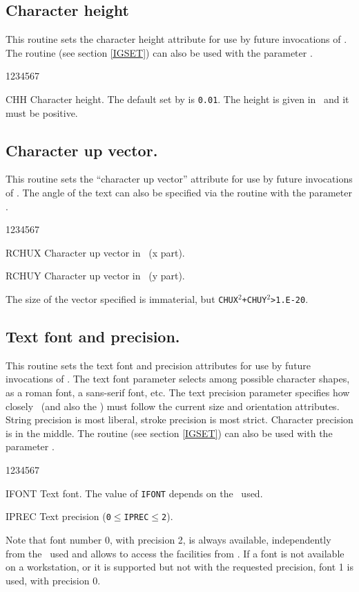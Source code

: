 \subsection{Character height}
\Action
This routine sets the character height attribute for use by future invocations
of . The routine  (see section \ref{IGSET}) can also be
used with the parameter .
\Pdesc
\begin{DLtt}{1234567}
\item[CHH] Character height. The default set by  is {\tt0.01}. The
           height is given in \WC~and it must be positive.
\end{DLtt}
%
\subsection{Character up vector.}
\Action
This routine sets the ``character up vector'' attribute for use by future
invocations of . The angle of the text can also be specified via the
 routine with the parameter .
\Pdesc
\begin{DLtt}{1234567}
\item[RCHUX] Character up vector in \WC~(x part).
\item[RCHUY] Character up vector in \WC~(y part).
\end{DLtt}
The size of the vector specified is immaterial, but
{\tt CHUX$^2$+CHUY$^2$>1.E-20}.
%
\subsection{Text font and precision.}
\Action
This routine sets the text font and precision attributes for use by future
invocations of . The text font parameter selects among possible
character shapes, as a roman font, a sans-serif font, etc. The text precision
parameter specifies how closely \HIGZ~(and also the \UGP) must follow the
current size and orientation attributes. String precision is most liberal,
stroke precision is most strict. Character precision is in the middle.
The routine  (see section \ref{IGSET}) can also be used with the
parameter .
\Pdesc
\begin{DLtt}{1234567}
\item[IFONT] Text font. The value of {\tt IFONT} depends on the \UGP~used.
\item[IPREC] Text precision ({\tt0\(\leq\)IPREC\(\leq\)2}).
\end{DLtt}
Note that font number 0, with precision 2, is always available, independently
from the \UGP~used and allows to access the  facilities from
. If a font is not available on a workstation, or it is supported
but not with the requested precision, font 1 is used, with precision 0.
